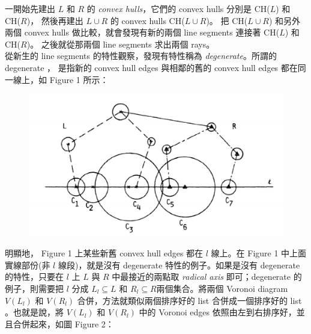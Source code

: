 \documentclass[12pt]{article}
\begin{document}
\begin{CJK}{UTF8}{bkai}
一開始先建出 $L$ 和 $R$ 的 {\it convex hulls}，它們的 convex hulls 分別是 CH($L$) 和 CH($R$)，
然後再建出 $L \cup R$ 的 convex hulls CH($L \cup R$)。
把 CH($L \cup R$) 和另外兩個 convex hulls 做比較，就會發現有新的兩個 line segments 連接著
 CH($L$) 和 CH($R$)。
之後就從那兩個 line segments 求出兩個 rays。\\

從新生的 line segments 的特性觀察，發現有特性稱為 {\it degenerate}。所謂的 degenerate ，
是指新的 convex hull edges 與相鄰的舊的 convex hull edges 都在同一線上，如 Figure 1 所示：\\


\begin{figure}[h]
\includegraphics[scale=0.5]{figure5(i).eps}
\caption{}
\label{}
\end{figure}

明顯地， Figure 1 上某些新舊 convex hull edges 都在 $l$ 線上。在 Figure 1 中上面實線部份(非 $l$ 線段)，就是沒有 degenerate
 特性的例子。如果是沒有 degenerate 的特性，只要在 $l$ 上 $L$ 與 $R$ 中最接近的兩點取 {\it radical axis}
 即可；degenerate 的例子，則需要把 $l$ 分成 $L_l \subseteq L$ 和 $R_l \subseteq R$兩個集合。將兩個 Voronoi
 diagram $V(L_l)$ 和 $V(R_l)$ 合併，方法就類似兩個排序好的 list 合併成一個排序好的 list 。也就是說，將 $V(L_l)$
 和 $V(R_l)$ 中的 Voronoi edges 依照由左到右排序好，並且合併起來，如圖 Figure 2：



\end{CJK}
\end{document}
